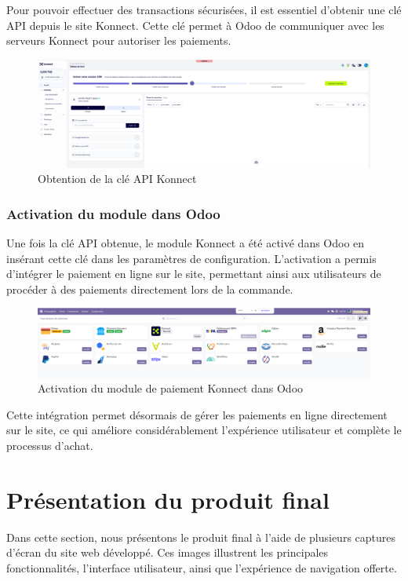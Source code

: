 \documentclass[12pt]{report}
\begin{document}
Pour pouvoir effectuer des transactions sécurisées, il est essentiel d’obtenir une clé API depuis le site Konnect. Cette clé permet à Odoo de communiquer avec les serveurs Konnect pour autoriser les paiements.

\begin{figure}[H]
\centering
\includegraphics[width=1\textwidth]{images/api_key.PNG}
\caption{Obtention de la clé API Konnect}
\end{figure}

\subsection{Activation du module dans Odoo}

Une fois la clé API obtenue, le module Konnect a été activé dans Odoo en insérant cette clé dans les paramètres de configuration. L'activation a permis d'intégrer le paiement en ligne sur le site, permettant ainsi aux utilisateurs de procéder à des paiements directement lors de la commande.

\begin{figure}[H]
\centering
\includegraphics[width=1\textwidth]{images/activer payment.PNG}
\caption{Activation du module de paiement Konnect dans Odoo}
\end{figure}

Cette intégration permet désormais de gérer les paiements en ligne directement sur le site, ce qui améliore considérablement l’expérience utilisateur et complète le processus d’achat.



\chapter{Présentation du produit final}
Dans cette section, nous présentons le produit final à l’aide de plusieurs captures d’écran du site web développé. Ces images illustrent les principales fonctionnalités, l’interface utilisateur, ainsi que l’expérience de navigation offerte.
\end{document}
